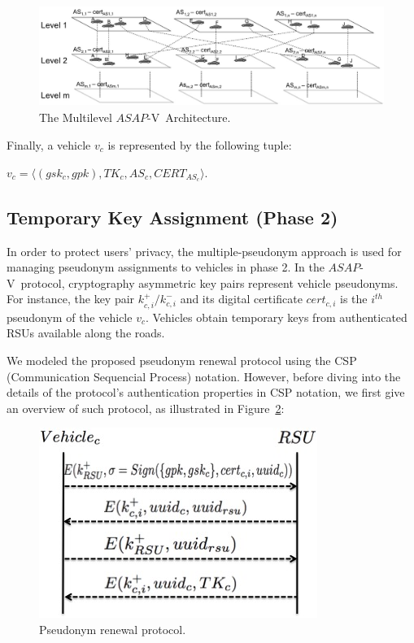 \documentclass[preprint,12pt]{elsarticle}
\newcommand{\protocolname}{$ASAP$-V}
\begin{document}
\begin{figure}[ht]
\centering
\includegraphics[width=5.5in, height=1.3in]{figures/vehicle-groups3-en.jpg}
\caption{The Multilevel \protocolname~Architecture.}
\label{fig:multilevel-arch}
\end{figure}


Finally, a vehicle $v_{c}$ is represented by the following tuple:

\begin{center}
$v_{c} = \langle (gsk_{c}, gpk), TK_{c}, AS_{c}, CERT_{AS_{c}}  \rangle$.
\end{center}


\subsection{Temporary Key Assignment (Phase 2)}
\label{sec:phase2}

In order to protect users' privacy, the multiple-pseudonym approach is used for managing pseudonym assignments to vehicles in phase 2. In the \protocolname~protocol, cryptography asymmetric key pairs represent vehicle pseudonyms. For instance, the key pair $k^{+}_{c, i}/k^{-}_{c, i}$ and its digital certificate $cert_{c,i}$ is the $i^{th}$ pseudonym of the vehicle $v_{c}$. Vehicles obtain temporary keys from authenticated RSUs available along the roads.

We modeled the proposed pseudonym renewal protocol using the CSP (Communication Sequencial Process) notation. However, before diving into the details of the protocol's authentication properties in CSP notation, we first give an overview of such protocol, as illustrated in Figure~\ref{fig:renewalprotocol}:

\begin{figure}[ht]
\centering
\includegraphics[scale=.45]{figures/asapvrenewalprotocol.jpg}
\caption{Pseudonym renewal protocol.}
\label{fig:renewalprotocol}
\end{figure}
\end{document}

